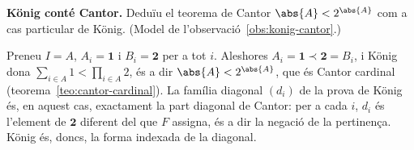 \begin{exercici}
\textbf{König conté Cantor.} Deduïu el teorema de Cantor \(\abs{A}<2^{\abs{A}}\) com a cas particular de König. (Model de l'observació~\ref{obs:konig-cantor}.)
\end{exercici}
\begin{solucio}
Preneu \(I=A\), \(A_i=\mathbf1\) i \(B_i=\mathbf2\) per a tot \(i\). Aleshores \(A_i=\mathbf1\prec\mathbf2=B_i\), i König dona \(\sum_{i\in A}1<\prod_{i\in A}2\), és a dir \(\abs{A}<2^{\abs{A}}\), que és Cantor cardinal (teorema~\ref{teo:cantor-cardinal}). La família diagonal \((d_i)\) de la prova de König és, en aquest cas, exactament la part diagonal de Cantor: per a cada \(i\), \(d_i\) és l'element de \(\mathbf2\) diferent del que \(F\) assigna, és a dir la negació de la pertinença. König és, doncs, la forma indexada de la diagonal.
\end{solucio}
